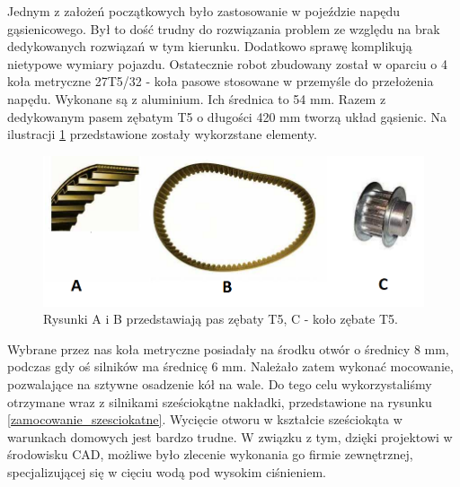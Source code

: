 Jednym z założeń początkowych było zastosowanie w pojeździe napędu gąsienicowego. Był to dość trudny do rozwiązania problem ze względu na brak dedykowanych rozwiązań w tym kierunku. Dodatkowo sprawę komplikują nietypowe wymiary pojazdu. Ostatecznie robot zbudowany został w oparciu o 4 koła metryczne 27T5/32 - koła pasowe stosowane w przemyśle do przełożenia napędu. Wykonane są z aluminium. Ich średnica to 54 mm. Razem z dedykowanym pasem zębatym T5 o długości 420 mm tworzą układ gąsienic. Na ilustracji \ref{gasienice_elementy} przedstawione zostały wykorzstane elementy.

  \begin{figure}[H]
    \begin{center}
      \includegraphics[scale=0.5]{imgs/gasienice.png}
 	\caption[Elementy gąsienic.]{\small{Rysunki A i B przedstawiają pas zębaty T5, C - koło zębate T5. }\footnotemark}
	\label{gasienice_elementy}
    \end{center}
  \end{figure}

Wybrane przez nas koła metryczne posiadały na środku otwór o średnicy 8 mm, podczas gdy oś silników ma średnicę 6 mm. Należało zatem wykonać mocowanie, pozwalające na sztywne osadzenie kół na wale. Do tego celu wykorzystaliśmy otrzymane wraz z silnikami sześciokątne nakładki, przedstawione na rysunku \ref{zamocowanie_szesciokatne}. Wycięcie otworu w kształcie sześciokąta w warunkach domowych jest bardzo trudne. W związku z tym, dzięki projektowi w środowisku CAD, możliwe było zlecenie wykonania go firmie zewnętrznej, specjalizującej się w cięciu wodą pod wysokim ciśnieniem.

